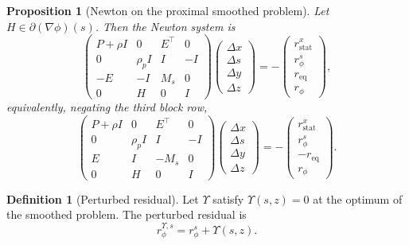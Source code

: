 \documentclass[a4paper,11pt]{book}
\theoremstyle{plain}
\newtheorem{proposition}[theorem]{Proposition}
\theoremstyle{definition}
\newtheorem{definition}[theorem]{Definition}
\theoremstyle{remark}
\numberwithin{equation}{chapter}
\numberwithin{algorithm}{chapter}
\begin{document}
	
	\begin{proposition}[Newton on the proximal smoothed problem]
		Let $H\in\partial(\nabla\phi)(s)$. Then the Newton system is
		\begin{equation}
			\begin{pmatrix}
				P+\rho I & 0 & E^\top & 0\\
				0 & \rho_p I & I & -I\\
				-E & -I & M_s & 0\\
				0 & H & 0 & I
			\end{pmatrix}
			\begin{pmatrix}
				\Delta x\\ \Delta s\\ \Delta y\\ \Delta z
			\end{pmatrix}
			=-
			\begin{pmatrix}
				r_{\mathrm{stat}}^x\\ r_\phi^s\\ r_{\mathrm{eq}}\\ r_\phi
			\end{pmatrix},
		\end{equation}
		equivalently, negating the third block row,
		\begin{equation}
			\begin{pmatrix}
				P+\rho I & 0 & E^\top & 0\\
				0 & \rho_p I & I & -I\\
				E & I & -M_s & 0\\
				0 & H & 0 & I
			\end{pmatrix}
			\begin{pmatrix}
				\Delta x\\ \Delta s\\ \Delta y\\ \Delta z
			\end{pmatrix}
			=-
			\begin{pmatrix}
				r_{\mathrm{stat}}^x\\ r_\phi^s\\ -r_{\mathrm{eq}}\\ r_\phi
			\end{pmatrix}.
		\end{equation}
	\end{proposition}
	
	\begin{definition}[Perturbed residual]
		Let $\Upsilon$ satisfy $\Upsilon(s,z)=0$ at the optimum of the smoothed
		problem. The perturbed residual is
		\[
		r_{\phi}^{\Upsilon,s}=r^s_{\phi}+\Upsilon(s,z).
		\]
	\end{definition}
	
\end{document}
